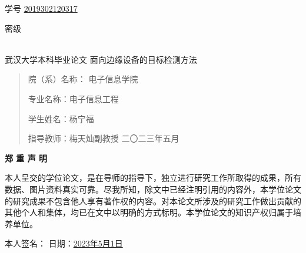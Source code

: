 \documentclass{ctexart}
\date{}
\numberwithin{equation}{section}%
\numberwithin{figure}{section}%
\numberwithin{table}{section}%
\begin{document}
	
	
	\heiti {}\qquad\qquad\qquad\qquad\qquad\qquad\qquad\qquad\qquad\qquad\qquad\qquad\qquad\qquad\qquad 学号 \underline {2019302120317}
	
	\heiti {}\qquad\qquad\qquad\qquad\qquad\qquad\qquad\qquad\qquad\qquad\qquad\qquad\qquad\qquad\qquad 密级 \underline {\qquad\qquad\qquad\quad}
	
	\begin{center}
		\quad \\
		\vskip 1cm
		\songti {} 武汉大学本科毕业论文
		\vskip 3.5cm
		\heiti {} 面向边缘设备的目标检测方法	
	\end{center}
	\vskip 2cm	
	\begin{quotation}
		\doublespacing
		

		\songti {}\setlength\parindent{6em}
		
		\quad
		
		院（系）名\enspace 称： 电子信息学院
		
		专\enspace 业\enspace 名\enspace 称\quad ：电子信息工程
		
		学\enspace 生\enspace 姓\enspace 名\quad ：杨宁福
		
		指\enspace 导\enspace 教\enspace 师\quad ：梅天灿\quad 副教授
		\vskip 3cm
		\centering
		\songti {}二〇二三年五月
	\end{quotation}

	\newpage
	\thispagestyle{empty}
	\begin{center}
		\songti{} \textbf{郑 \quad 重 \quad 声 \quad 明}
	\end{center}
	\vskip 2cm
	\songti\zihao{4}
	\qquad 本人呈交的学位论文，是在导师的指导下，独立进行研究工作所取得的成果，所有数据、图片资料真实可靠。尽我所知，除文中已经注明引用的内容外，本学位论文的研究成果不包含他人享有著作权的内容。对本论文所涉及的研究工作做出贡献的其他个人和集体，均已在文中以明确的方式标明。本学位论文的知识产权归属于培养单位。
	
	\vskip 5cm
	\begin{center}
		本人签名：	
		\raisebox{-0.25\baselineskip}{\texttt{[image: n]}} \qquad\qquad\qquad 日期：\underline{\quad  2023年5月1日 \quad}
	\end{center}
	
\end{document}
